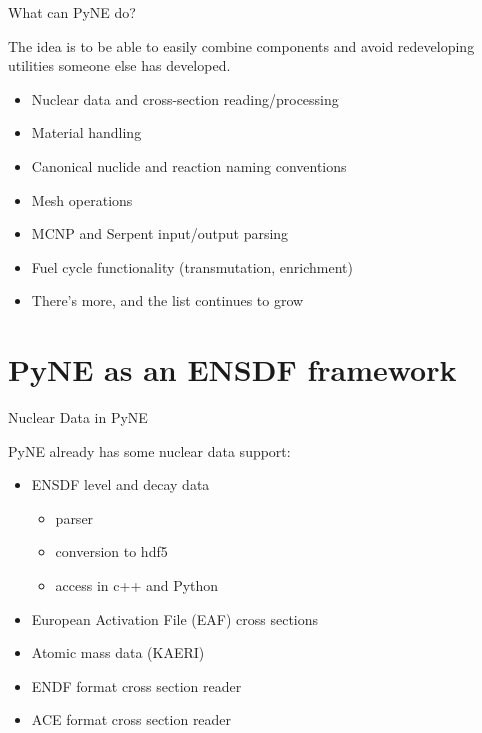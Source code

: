 \documentclass[xcolor=x11names,compress]{beamer}
\renewcommand{\(}{\begin{columns}}
\renewcommand{\)}{\end{columns}}
\newcommand{\<}[1]{\begin{column}{#1}}
\renewcommand{\>}{\end{column}}
\begin{document}
\begin{frame}{What can PyNE do?}

    The idea is to be able to easily combine components and avoid redeveloping
    utilities someone else has developed.

    \begin{itemize}
      \item \alert{Nuclear data} and cross-section reading/processing
      \item Material handling
      \item Canonical nuclide and reaction naming conventions
      \item Mesh operations
      \item MCNP and Serpent input/output parsing
      \item Fuel cycle functionality (transmutation, enrichment)
      \item There's more, and the list continues to grow
    \end{itemize}

\end{frame}

\section{PyNE as an ENSDF framework}
\begin{frame}{Nuclear Data in PyNE}

    PyNE already has some nuclear data support:
    \vspace*{1 em}
    \begin{itemize}
      \item \alert{ENSDF} level and decay data
      \begin{itemize}
        \item parser
        \item conversion to hdf5
        \item access in c++ and Python
      \end{itemize}
      \item European Activation File (\alert{EAF}) cross sections
      \item Atomic \alert{mass} data (KAERI)
      \item \alert{ENDF} format cross section reader
      \item \alert{ACE} format cross section reader
    \end{itemize}
\end{frame}
\end{document}
